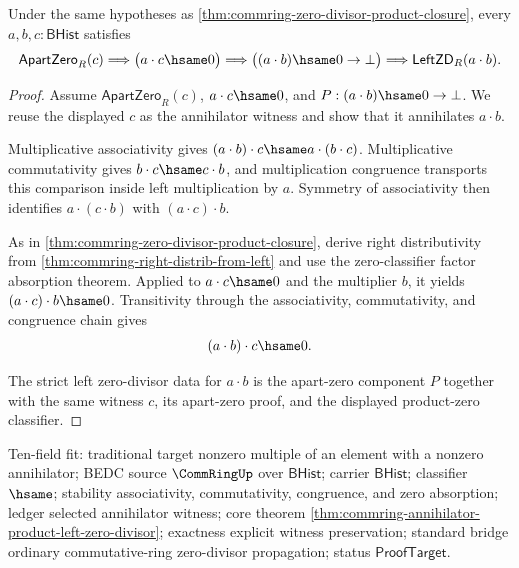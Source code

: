 \begin{theorem}
\label{thm:commring-annihilator-product-left-zero-divisor}
Under the same hypotheses as
\autoref{thm:commring-zero-divisor-product-closure}, every
$a,b,c:\mathsf{BHist}$ satisfies
$$
\mathsf{ApartZero}_R(c)
\Longrightarrow
\bigl(a\cdot c\hsame0\bigr)
\Longrightarrow
\bigl((a\cdot b)\hsame0\to\bot\bigr)
\Longrightarrow
\mathsf{LeftZD}_R(a\cdot b).
$$
\end{theorem}
\begin{proof}
Assume $\mathsf{ApartZero}_R(c)$, $a\cdot c\hsame0$, and
$P:(a\cdot b)\hsame0\to\bot$. We reuse the displayed $c$ as the annihilator
witness and show that it annihilates $a\cdot b$.

Multiplicative associativity gives
$(a\cdot b)\cdot c\hsame a\cdot(b\cdot c)$. Multiplicative commutativity gives
$b\cdot c\hsame c\cdot b$, and multiplication congruence transports this
comparison inside left multiplication by $a$. Symmetry of associativity then
identifies $a\cdot(c\cdot b)$ with $(a\cdot c)\cdot b$.

As in \autoref{thm:commring-zero-divisor-product-closure}, derive right
distributivity from \autoref{thm:commring-right-distrib-from-left} and use the
zero-classifier factor absorption theorem. Applied to $a\cdot c\hsame0$ and
the multiplier $b$, it yields $(a\cdot c)\cdot b\hsame0$. Transitivity through
the associativity, commutativity, and congruence chain gives
$$
(a\cdot b)\cdot c\hsame0.
$$

The strict left zero-divisor data for $a\cdot b$ is the apart-zero component
$P$ together with the same witness $c$, its apart-zero proof, and the displayed
product-zero classifier.
\end{proof}
Ten-field fit: traditional target nonzero multiple of an element with a
nonzero annihilator; BEDC source $\CommRingUp$ over $\mathsf{BHist}$; carrier
$\mathsf{BHist}$; classifier $\hsame$; stability associativity,
commutativity, congruence, and zero absorption; ledger selected annihilator
witness; core theorem \autoref{thm:commring-annihilator-product-left-zero-divisor};
exactness explicit witness preservation; standard bridge ordinary
commutative-ring zero-divisor propagation; status $\mathsf{ProofTarget}$.

